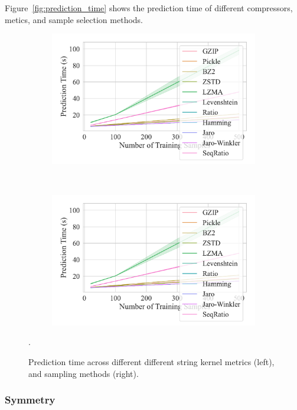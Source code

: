 \documentclass[sigconf]{acmart}
\begin{document}
Figure~\ref{fig:prediction_time} shows the prediction time of different compressors, metics, and sample selection methods.
\begin{figure}
	\begin{subfigure}
		\centering
		\includegraphics[width=.46\textwidth]{figs/kdd_nsl/metric_vs_predict_time.pdf}
	\end{subfigure}
	~
	\begin{subfigure}
		\centering
		\includegraphics[width=.46\textwidth]{figs/kdd_nsl/metric_vs_predict_time.pdf}
	\end{subfigure}
	\caption{Prediction time across different different string kernel metrics (left), and sampling methods (right).}.
	\label{fig:prediction_time_kdd}
\end{figure}

\subsubsection{Symmetry}
\end{document}
